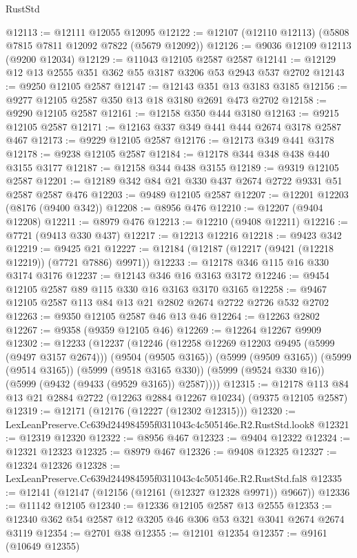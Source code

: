 \begin{lexlean}{RustStd}
\begin{coremodule}
@12113 := @12111 @12055 @12095
@12122 := @12107 (@12110 @12113) (@5808 @7815 @7811 @12092 @7822 (@5679 @12092))
@12126 := @9036 @12109 @12113 (@9200 @12034)
@12129 := @11043 @12105 @2587 @2587
@12141 := @12129 @12 @13 @2555 @351 @362 @55 @3187 @3206 @53 @2943 @537 @2702
@12143 := @9250 @12105 @2587
@12147 := @12143 @351 @13 @3183 @3185
@12156 := @9277 @12105 @2587 @350 @13 @18 @3180 @2691 @473 @2702
@12158 := @9290 @12105 @2587
@12161 := @12158 @350 @444 @3180
@12163 := @9215 @12105 @2587
@12171 := @12163 @337 @349 @441 @444 @2674 @3178 @2587 @467
@12173 := @9229 @12105 @2587
@12176 := @12173 @349 @441 @3178
@12178 := @9238 @12105 @2587
@12184 := @12178 @344 @348 @438 @440 @3155 @3177
@12187 := @12158 @344 @438 @3155
@12189 := @9319 @12105 @2587
@12201 := @12189 @342 @84 @21 @330 @437 @2674 @2722 @9331 @51 @2587 @2587 @476
@12203 := @9489 @12105 @2587
@12207 := @12201 @12203 (@8176 (@9400 @342))
@12208 := @8956 @476
@12210 := @12207 (@9404 @12208)
@12211 := @8979 @476
@12213 := @12210 (@9408 @12211)
@12216 := @7721 (@9413 @330 @437)
@12217 := @12213 @12216
@12218 := @9423 @342
@12219 := @9425 @21
@12227 := @12184 (@12187 (@12217 (@9421 (@12218 @12219)) (@7721 @7886) @9971))
@12233 := @12178 @346 @115 @16 @330 @3174 @3176
@12237 := @12143 @346 @16 @3163 @3172
@12246 := @9454 @12105 @2587 @89 @115 @330 @16 @3163 @3170 @3165
@12258 := @9467 @12105 @2587 @113 @84 @13 @21 @2802 @2674 @2722 @2726 @532 @2702
@12263 := @9350 @12105 @2587 @46 @13 @46
@12264 := @12263 @2802
@12267 := @9358 (@9359 @12105 @46)
@12269 := @12264 @12267 @9909
@12302 := @12233
    (@12237
      (@12246
        (@12258 @12269 @12203 @9495 (@5999 (@9497 @3157 @2674)))
        (@9504 (@9505 @3165))
        (@5999 (@9509 @3165))
        (@5999 (@9514 @3165))
        (@5999 (@9518 @3165 @330))
        (@5999 (@9524 @330 @16))
        (@5999 (@9432 (@9433 (@9529 @3165)) @2587))))
@12315 := @12178 @113 @84 @13 @21 @2884 @2722 (@12263 @2884 @12267 @10234) (@9375 @12105 @2587)
@12319 := @12171 (@12176 (@12227 (@12302 @12315)))
@12320 := LexLeanPreserve.Cc639d244984595f0311043c4c505146e.R2.RustStd.look8
@12321 := @12319 @12320
@12322 := @8956 @467
@12323 := @9404 @12322
@12324 := @12321 @12323
@12325 := @8979 @467
@12326 := @9408 @12325
@12327 := @12324 @12326
@12328 := LexLeanPreserve.Cc639d244984595f0311043c4c505146e.R2.RustStd.fal8
@12335 := @12141 (@12147 (@12156 (@12161 (@12327 @12328 @9971)) @9667))
@12336 := @11142 @12105
@12340 := @12336 @12105 @2587 @13 @2555
@12353 := @12340 @362 @54 @2587 @12 @3205 @46 @306 @53 @321 @3041 @2674 @2674 @3119
@12354 := @2701 @38
@12355 := @12101 @12354
@12357 := @9161 (@10649 @12355)

\end{coremodule}
\end{lexlean}
